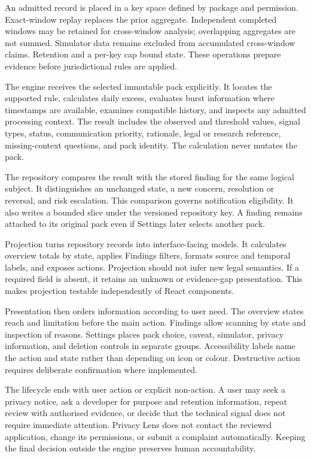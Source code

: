 An admitted record is placed in a key space defined by package and permission. Exact-window replay replaces the prior aggregate. Independent completed windows may be retained for cross-window analysis; overlapping aggregates are not summed. Simulator data remains excluded from accumulated cross-window claims. Retention and a per-key cap bound state. These operations prepare evidence before jurisdictional rules are applied.

The engine receives the selected immutable pack explicitly. It locates the supported rule, calculates daily excess, evaluates burst information where timestamps are available, examines compatible history, and inspects any admitted processing context. The result includes the observed and threshold values, signal types, status, communication priority, rationale, legal or research reference, missing-context questions, and pack identity. The calculation never mutates the pack.

The repository compares the result with the stored finding for the same logical subject. It distinguishes an unchanged state, a new concern, resolution or reversal, and risk escalation. This comparison governs notification eligibility. It also writes a bounded slice under the versioned repository key. A finding remains attached to its original pack even if Settings later selects another pack.

Projection turns repository records into interface-facing models. It calculates overview totals by state, applies Findings filters, formats source and temporal labels, and exposes actions. Projection should not infer new legal semantics. If a required field is absent, it retains an unknown or evidence-gap presentation. This makes projection testable independently of React components.

Presentation then orders information according to user need. The overview states reach and limitation before the main action. Findings allow scanning by state and inspection of reasons. Settings places pack choice, caveat, simulator, privacy information, and deletion controls in separate groups. Accessibility labels name the action and state rather than depending on icon or colour. Destructive action requires deliberate confirmation where implemented.

The lifecycle ends with user action or explicit non-action. A user may seek a privacy notice, ask a developer for purpose and retention information, repeat review with authorised evidence, or decide that the technical signal does not require immediate attention. Privacy Lens does not contact the reviewed application, change its permissions, or submit a complaint automatically. Keeping the final decision outside the engine preserves human accountability.

